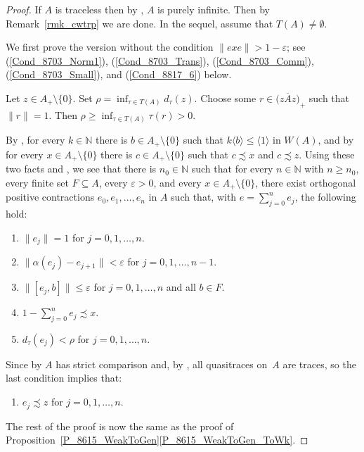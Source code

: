 \documentclass[11pt]{amsart}
\theoremstyle{plain}
\theoremstyle{definition}
\theoremstyle{remark}
\numberwithin{equation}{section}
\newcounter{TmpEnumi}
\newcommand{\N}{\mathbb{N}}
\newcommand{\ep}{\varepsilon}
\newcommand{\rh}{\rho}
\newcommand{\ta}{\tau}
\begin{document}
\begin{proof}
If $A$ is traceless then by \cite[Corllary~5.1]{Ro04}, $A$ is purely infinite.
Then by Remark~\ref{rmk_cwtrp} we are done. In the
sequel, assume that $T(A)\neq \emptyset$.

We first prove the version without
the condition
$\| e x e \| > 1 - \ep$;
see (\ref{Cond_8703_Norm1}),
(\ref{Cond_8703_Trans}),
(\ref{Cond_8703_Comm}),
(\ref{Cond_8703_Small}),
and (\ref{Cond_8817_6}) below.

Let $z \in A_{+} \setminus \{ 0 \}$.
Set $\rho = \inf_{\ta \in T (A)} d_{\ta} (z)$.
Choose some $r \in \big( {\overline{z A z}} \big)_{+}$
such that $\| r \| = 1$.
Then $\rh \geq \inf_{\ta \in T (A)} \ta (r) > 0$.

By \cite[Lemma~2.4]{Ph14},
for every $k \in \N$
there is $b \in A_{+} \setminus \{ 0 \}$
such that $k \langle b \rangle \leq \langle 1 \rangle$
in $W (A)$,
and by \cite[Lemma~2.4]{Ph14}
for every $x \in A_{+} \setminus \{ 0 \}$
there is $c \in A_{+} \setminus \{ 0 \}$
such that $c \precsim x$ and $c \precsim z$.
Using these two facts and \cite[Lemma~6.5]{HO13},
we see that there is $n_0 \in \N$ such that
for every $n \in \mathbb{N}$ with $n \geq n_0$,
every finite set $F \subseteq A$, every $\varepsilon > 0$,
and every $x \in A_{+} \setminus \{ 0 \}$,
there exist orthogonal positive contractions
$e_{0}, e_{1}, \ldots, e_{n}$ in $A$ such that,
with $e = \sum_{j = 0}^{n} e_{j}$, the following hold:
%
\begin{enumerate}
%
\item\label{Cond_8703_Norm1}
$\| e_j \| = 1$ for $j = 0, 1, \ldots, n$.
%
\item\label{Cond_8703_Trans}
$\| \alpha (e_{j}) - e_{j + 1} \| < \varepsilon$
for $j = 0, 1, \ldots, n - 1$.
%
\item\label{Cond_8703_Comm}
$\| [e_{j}, b] \| \leq \varepsilon$
for $j = 0, 1, \ldots, n$ and all $b \in F$.
%
\item\label{Cond_8703_Small}
$1 - \sum_{j = 0}^n e_j \precsim x$.
%
\item\label{Cond_8703_Controlled}
$d_{\ta} (e_j) < \rho$
for $j = 0, 1, \ldots, n$.
\setcounter{TmpEnumi}{\value{enumi}}
\end{enumerate}
%
Since by \cite[Theorem~3.3]{HO13} $A$ has strict comparison
and, by \cite[Theorem 5.11]{Haa}, all quasitraces on~$A$ are traces, so
the last condition implies that:
%
\begin{enumerate}
%
\setcounter{enumi}{\value{TmpEnumi}}
\item\label{Cond_8817_6}
$e_j \precsim z$
for $j = 0, 1, \ldots, n$.
\end{enumerate}
%

The rest of the proof
is now the same as the proof of
Proposition~\ref{P_8615_WeakToGen}\ref{P_8615_WeakToGen_ToWk}.
\end{proof}
\end{document}
